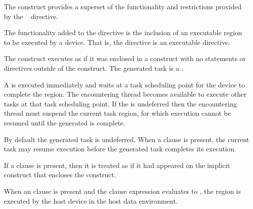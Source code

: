\descr
The  construct provides a superset of the functionality and restrictions provided by the ~ directive.

The functionality added to the  directive is the inclusion of an executable region to be executed by a device. That is, the  directive is an executable directive.

The  construct executes as if it was enclosed in a  construct with no statements or directives outside of the  construct. The generated task is a .

A  is executed immediately and waits at a task scheduling point for the device to complete the  region. The encountering thread becomes available to execute other tasks at that task scheduling point. If the  is undeferred then the encountering thread must suspend the current task region, for which execution cannot be resumed until the generated  is complete.

By default the generated task is undeferred. When a  clause is present, the current task may resume execution before the generated task completes its execution.

If a  clause is present, then it is treated as if it had appeared on the implicit  construct that encloses the  construct.

When an  clause is present and the  clause expression evaluates to , the  region is executed by the host device in the host data environment.

